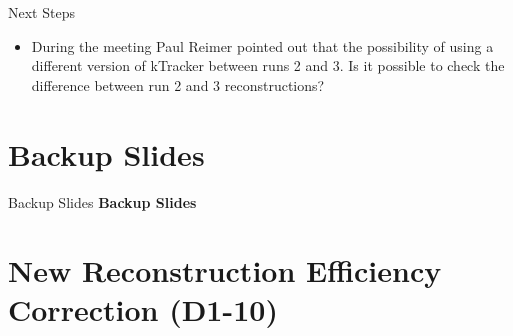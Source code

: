 \documentclass[aspectratio=169, 10pt]{beamer}
\begin{document}
\begin{frame}{Next Steps}
    \begin{itemize}
        \item During the meeting Paul Reimer pointed out that the possibility of using a different version of kTracker between runs 2 and 3. Is it possible to check the difference between run 2 and 3 reconstructions?
    \end{itemize}
\end{frame}

\section{Backup Slides}

\begin{frame}{Backup Slides}
    \vfill
    \centering
    {\Huge \textbf{Backup Slides}}
    \vfill
\end{frame}

\section{New Reconstruction Efficiency Correction (D1-10)}
\end{document}
